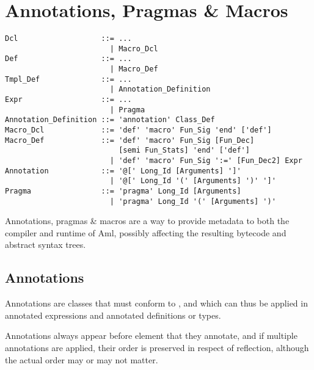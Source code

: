 
\chapter{Annotations, Pragmas \& Macros}
\label{sec:annotations}
\label{sec:pragmas}
\label{sec:macros}

\minitoc

\newpage


\grammar\begin{lstlisting}
Dcl                   ::= ...
                        | Macro_Dcl
Def                   ::= ...
                        | Macro_Def
Tmpl_Def              ::= ...
                        | Annotation_Definition
Expr                  ::= ...
                        | Pragma
Annotation_Definition ::= 'annotation' Class_Def
Macro_Dcl             ::= 'def' 'macro' Fun_Sig 'end' ['def']
Macro_Def             ::= 'def' 'macro' Fun_Sig [Fun_Dec] 
                          [semi Fun_Stats] 'end' ['def']
                        | 'def' 'macro' Fun_Sig ':=' [Fun_Dec2] Expr
Annotation            ::= '@[' Long_Id [Arguments] ']'
                        | '@[' Long_Id '(' [Arguments] ')' ']'
Pragma                ::= 'pragma' Long_Id [Arguments]
                        | 'pragma' Long_Id '(' [Arguments] ')'
\end{lstlisting}


Annotations, pragmas \& macros are a way to provide metadata to both the compiler and runtime of Aml, possibly affecting the resulting bytecode and abstract syntax trees. 





\section{Annotations}

Annotations are classes that must conform to , and which can thus be applied in annotated expressions and annotated definitions or types. 

Annotations always appear before element that they annotate, and if multiple annotations are applied, their order is preserved in respect of reflection, although the actual order may or may not matter. 

